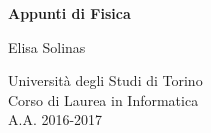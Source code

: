 \documentclass[12pt,fleqn]{book} %
\begin{document}

\begingroup
\thispagestyle{empty}
\centering
\vspace*{5cm}
\par\normalfont\fontsize{35}{35}\sffamily\selectfont
\textbf{Appunti di Fisica}\par %
\vspace*{1cm}
{\Huge Elisa Solinas}\par
\vspace*{1cm}
{\LARGE
	Università degli Studi di Torino \\ Corso di Laurea in Informatica \\ A.A. 2016-2017}\par %
\endgroup


\pagestyle{empty} %
\tableofcontents %
\pagestyle{fancy} %






\end{document}
